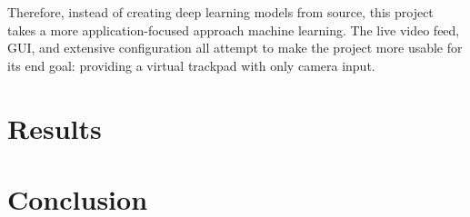 \documentclass{article}
\begin{document}
Therefore, instead of creating deep learning models from source, this project takes a more application-focused approach machine learning. The live video feed, GUI, and extensive configuration all attempt to make the project more usable for its end goal: providing a virtual trackpad with only camera input.



\section{Results}
\section{Conclusion}





\pagebreak
\nocite{*} %
\printbibliography %
\end{document}
